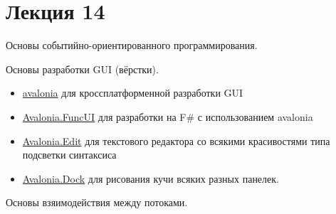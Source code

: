 \section{Лекция 14}

Основы событийно-ориентированного программирования. 

Основы разработки GUI (вёрстки).

\begin{itemize}
	\item \href{https://avaloniaui.net/}{avalonia} для кроссплатформенной разработки GUI
	\item \href{https://github.com/AvaloniaCommunity/Avalonia.FuncUI}{Avalonia.FuncUI} для разработки на F\# с использованием avalonia
	\item \href{https://github.com/AvaloniaUI/AvaloniaEdit}{Avalonia.Edit} для текстового редактора со всякими красивостями типа подсветки синтаксиса
	\item \href{https://wieslawsoltes.github.io/Dock/}{Avalonia.Dock} для рисования кучи всяких разных панелек.
\end{itemize}

Основы взяимодействия между потоками.
